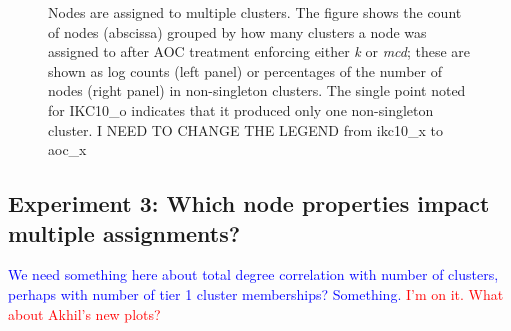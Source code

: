 \documentclass[11pt, oneside]{article}   	%
\begin{document}
\begin{figure}[H]
\begin{subfigure}[t]{0.48\textwidth}
    	\end{subfigure}
\captionsetup{width=0.9\textwidth}	
\caption{Nodes are assigned to multiple clusters. The figure shows the count of nodes (abscissa) grouped by how many clusters a node was assigned to after AOC treatment enforcing either \emph{k} or \emph{mcd};  these are shown as log counts (left panel) or percentages of the number of nodes (right panel) in non-singleton clusters. 
The single point noted for IKC10\_o indicates that it produced only one non-singleton cluster. I NEED TO CHANGE THE LEGEND from ikc10\_x to aoc\_x}
\label{fig:fig2}
\end{figure}


\subsection{Experiment 3: Which node properties impact multiple assignments?}

\textcolor{blue}{We need something here about total degree correlation with number of clusters, perhaps with number of tier 1 cluster memberships? Something.}
\textcolor{red}{I'm on it. What about Akhil's new plots?}
\end{document}
